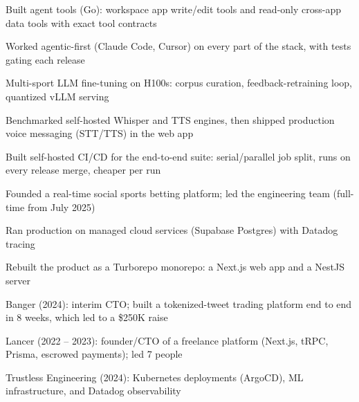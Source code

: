 \documentclass[print]{jack-resume}
\begin{document}
\begin{tightemize}
    \item Built agent tools (Go): workspace app write/edit tools and read-only cross-app data tools with exact tool contracts
    \item Worked agentic-first (Claude Code, Cursor) on every part of the stack, with tests gating each release
    \item Multi-sport LLM fine-tuning on H100s: corpus curation, feedback-retraining loop, quantized vLLM serving
    \item Benchmarked self-hosted Whisper and TTS engines, then shipped production voice messaging (STT/TTS) in the web app
    \item Built self-hosted CI/CD for the end-to-end suite: serial/parallel job split, runs on every release merge, cheaper per run
\end{tightemize}
\sectionsep

\begin{tightemize}
    \item Founded a real-time social sports betting platform; led the engineering team (full-time from July 2025)
    \item Ran production on managed cloud services (Supabase Postgres) with Datadog tracing
    \item Rebuilt the product as a Turborepo monorepo: a Next.js web app and a NestJS server
\end{tightemize}
\sectionsep

\begin{tightemize}
    \item Banger (2024): interim CTO; built a tokenized-tweet trading platform end to end in 8 weeks, which led to a \$250K raise
    \item Lancer (2022 -- 2023): founder/CTO of a freelance platform (Next.js, tRPC, Prisma, escrowed payments); led 7 people
    \item Trustless Engineering (2024): Kubernetes deployments (ArgoCD), ML infrastructure, and Datadog observability
\end{tightemize}
\sectionsep
\end{document}
